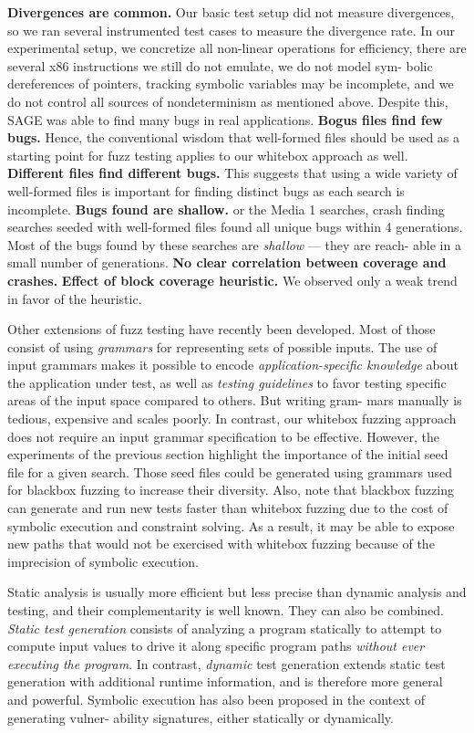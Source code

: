 \textbf{Divergences are common.}
Our basic test setup did not measure divergences, so we ran several instrumented test cases to measure the divergence rate.
In our experimental setup, we concretize all non-linear operations for efficiency, there are several x86 instructions we still do not emulate, we do not model sym- bolic dereferences of pointers, tracking symbolic variables may be incomplete, and we do not control all sources of nondeterminism as mentioned above. Despite this, SAGE was able to find many bugs in real applications.
\textbf{Bogus files find few bugs.}
Hence, the conventional wisdom that well-formed files should be used as a starting point for fuzz testing applies to our whitebox approach as well.
\textbf{Different files find different bugs.}
This suggests that using a wide variety of well-formed files is important for finding distinct bugs as each search is incomplete.
\textbf{Bugs found are shallow.}
or the Media 1 searches, crash finding searches seeded with well-formed files found all unique bugs within 4 generations.
Most of the bugs found by these searches are \textit{shallow} — they are reach- able in a small number of generations.
\textbf{No clear correlation between coverage and crashes.}
\textbf{Effect of block coverage heuristic.}
We observed only a weak trend in favor of the heuristic.

Other extensions of fuzz testing have recently been developed. Most of those consist of using \textit{grammars} for representing sets of possible inputs.
The use of input grammars makes it possible to encode \textit{application-specific knowledge} about the application under test, as well as \textit{testing guidelines} to favor testing specific areas of the input space compared to others.
But writing gram- mars manually is tedious, expensive and scales poorly. In contrast, our whitebox fuzzing approach does not require an input grammar specification to be effective. 
However, the experiments of the previous section highlight the importance of the initial seed file for a given search. Those seed files could be generated using grammars used for blackbox fuzzing to increase their diversity. 
Also, note that blackbox fuzzing can generate and run new tests faster than whitebox fuzzing due to the cost of symbolic execution and constraint solving. 
As a result, it may be able to expose new paths that would not be exercised with whitebox fuzzing because of the imprecision of symbolic execution.

Static analysis is usually more efficient but less precise than dynamic analysis and testing, and their complementarity is well known.
They can also be combined.
\textit{Static test generation} consists of analyzing a program statically to attempt to compute input values to drive it along specific program paths \textit{without ever executing the program}.
In contrast, \textit{dynamic} test generation extends static test generation with additional runtime information, and is therefore more general and powerful.
Symbolic execution has also been proposed in the context of generating vulner- ability signatures, either statically or dynamically.

